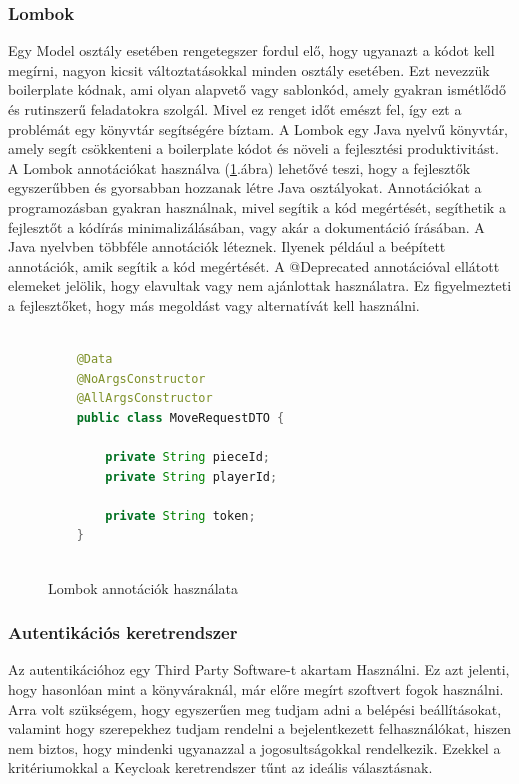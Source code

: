 \documentclass[a4paper,twoside]{article}
\begin{document}
\subsubsection{Lombok}
Egy Model osztály esetében rengetegszer fordul elő, hogy ugyanazt a kódot kell megírni, nagyon kicsit változtatásokkal minden osztály esetében. Ezt nevezzük boilerplate kódnak, ami olyan alapvető vagy sablonkód, amely gyakran ismétlődő és rutinszerű feladatokra szolgál. Mivel ez renget időt emészt fel, így ezt a problémát egy könyvtár segítségére bíztam. 
A Lombok \cite{lombok}  egy Java nyelvű könyvtár, amely
segít csökkenteni a boilerplate kódot és növeli a fejlesztési produktivitást.  A Lombok annotációkat használva (\ref{lombok}.ábra) lehetővé teszi, hogy a fejlesztők egyszerűbben és gyorsabban hozzanak létre Java osztályokat. Annotációkat a programozásban gyakran használnak, mivel segítik a kód megértését, segíthetik a fejlesztőt a kódírás minimalizálásában, vagy akár a dokumentáció írásában. A Java nyelvben többféle annotációk léteznek. Ilyenek például a beépített annotációk, amik segítik a kód
megértését. A @Deprecated annotációval ellátott elemeket jelölik, hogy elavultak vagy nem ajánlottak használatra. Ez figyelmezteti a fejlesztőket, hogy más megoldást vagy alternatívát kell használni.

\begin{figure}
	\caption{Lombok annotációk használata}
	\centering
	\begin{lstlisting}[language=java]
		
	@Data
	@NoArgsConstructor
	@AllArgsConstructor
	public class MoveRequestDTO {
		
		private String pieceId;
		private String playerId;
		
		private String token;
	}
		
	\end{lstlisting}
	\label{lombok}
\end{figure} 

\subsubsection{Autentikációs keretrendszer}
Az autentikációhoz egy Third Party Software-t akartam Használni. Ez azt jelenti, hogy hasonlóan mint a könyváraknál, már előre megírt szoftvert fogok használni. Arra volt szükségem, hogy egyszerűen meg tudjam adni a belépési beállításokat, valamint hogy szerepekhez tudjam rendelni a bejelentkezett felhasználókat, hiszen nem biztos, hogy mindenki ugyanazzal a jogosultságokkal rendelkezik. Ezekkel a kritériumokkal a Keycloak\cite{keycloak} keretrendszer tűnt az ideális választásnak. 
\end{document}
